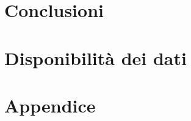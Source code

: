 \section{Conclusioni}
\lipsum[1-5]

\section*{Disponibilità dei dati}


\printbibliography[title=Riferimenti]
\pagebreak
\appendix
\section*{Appendice}
\lipsum[1-5]